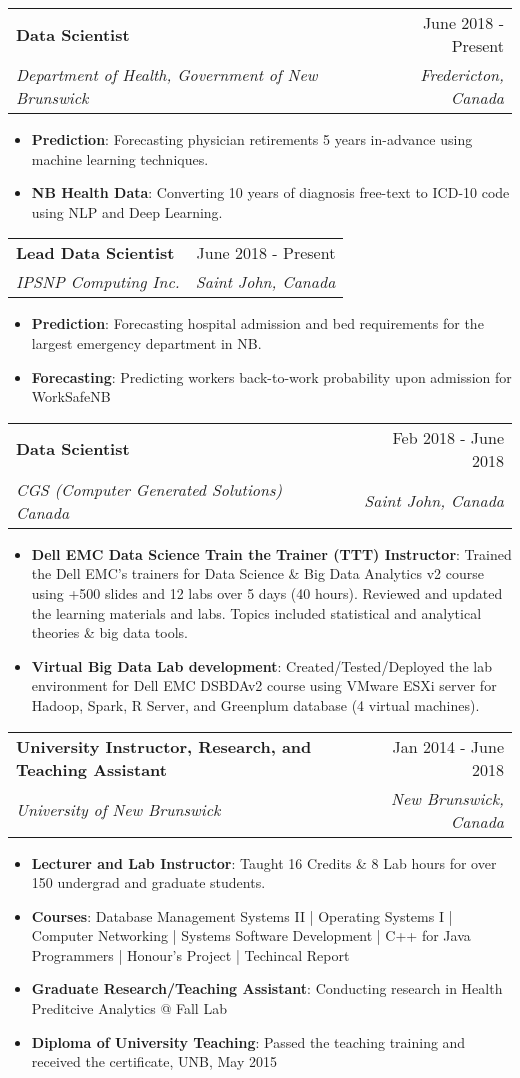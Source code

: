\documentclass[letterpaper,11pt]{article}
\makeatletter
\newcommand{\resumeItem}[2]{
  \item\small{
    \textbf{#1}{: #2 \vspace{-2pt}}
  }
}
\newcommand{\resumeSubheading}[4]{
  \vspace{-1pt}\item
    \begin{tabular*}{0.97\textwidth}{l@{\extracolsep{\fill}}r}
      \textbf{#1} & #2 \\
      \textit{\small#3} & \textit{\small #4} \\
    \end{tabular*}\vspace{-5pt}
}
\newcommand{\resumeItemListStart}{\begin{itemize}}
\newcommand{\resumeItemListEnd}{\end{itemize}\vspace{-5pt}}
\makeatother
\begin{document}
    \resumeSubheading
          {Data Scientist}{June 2018 - Present}
      {Department of Health, Government of New Brunswick}{Fredericton, Canada}
      \resumeItemListStart
                \resumeItem{Prediction}
          {Forecasting physician retirements 5 years in-advance using machine learning techniques.}
        \resumeItem{NB Health Data}
          {Converting 10 years of diagnosis free-text to ICD-10 code using NLP and Deep Learning.}

      \resumeItemListEnd

    \resumeSubheading
          {Lead Data Scientist}{June 2018 - Present}
      {IPSNP Computing Inc.}{Saint John, Canada}
            \resumeItemListStart
          \resumeItem{Prediction}
          {Forecasting hospital admission and bed requirements for the largest emergency department in NB.}
        \resumeItem{Forecasting}
          {Predicting workers back-to-work probability upon admission for WorkSafeNB}
      \resumeItemListEnd
    \resumeSubheading
      {Data Scientist}{Feb 2018 - June 2018}
      {CGS (Computer Generated Solutions) Canada}{Saint John, Canada}
      \resumeItemListStart
        \resumeItem{Dell EMC Data Science Train the Trainer (TTT) Instructor}
          {Trained the Dell EMC's trainers for Data Science \& Big Data Analytics v2 course using +500 slides and 12 labs over 5 days (40 hours). Reviewed and updated the learning materials and labs. Topics included statistical and analytical theories \& big data tools.}
        \resumeItem{Virtual Big Data Lab development}
          {Created/Tested/Deployed the lab environment for Dell EMC DSBDAv2 course using VMware ESXi server for Hadoop, Spark, R Server, and Greenplum database (4 virtual machines).}
      \resumeItemListEnd

    \resumeSubheading
	  {University Instructor, Research, and Teaching Assistant}{Jan 2014 - June 2018}
      {University of New Brunswick}{New Brunswick, Canada}
      

      \resumeItemListStart
        \resumeItem{Lecturer and Lab Instructor}
          {Taught 16 Credits \& 8 Lab hours for over 150 undergrad and graduate students.} \resumeItem{Courses}{ Database Management Systems II | Operating Systems I | Computer Networking | Systems Software Development | C++ for Java Programmers | Honour's Project | Techincal Report}
                  \resumeItem{Graduate Research/Teaching Assistant}{Conducting research in Health Preditcive Analytics @ Fall Lab}
         \resumeItem{Diploma of University Teaching}
          {Passed the teaching training and received the certificate, UNB, May 2015}
      \resumeItemListEnd
\end{document}
